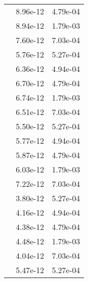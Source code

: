 \begin{table}
\begin{tabular}{c|cc|}
\multicolumn{1}{|c|}{} & \multicolumn{1}{|c|}{  8.96e-12} & \multicolumn{1}{|c|}{  4.79e-04} \\ 
\multicolumn{1}{|c|}{} & \multicolumn{1}{|c|}{  8.94e-12} & \multicolumn{1}{|c|}{  1.79e-03} \\ 
\multicolumn{1}{|c|}{} & \multicolumn{1}{|c|}{  7.60e-12} & \multicolumn{1}{|c|}{  7.03e-04} \\ 
\multicolumn{1}{|c|}{} & \multicolumn{1}{|c|}{  5.76e-12} & \multicolumn{1}{|c|}{  5.27e-04} \\ 
\multicolumn{1}{|c|}{} & \multicolumn{1}{|c|}{  6.36e-12} & \multicolumn{1}{|c|}{  4.94e-04} \\ 
\multicolumn{1}{|c|}{} & \multicolumn{1}{|c|}{  6.70e-12} & \multicolumn{1}{|c|}{  4.79e-04} \\ 
\multicolumn{1}{|c|}{} & \multicolumn{1}{|c|}{  6.74e-12} & \multicolumn{1}{|c|}{  1.79e-03} \\ 
\multicolumn{1}{|c|}{} & \multicolumn{1}{|c|}{  6.51e-12} & \multicolumn{1}{|c|}{  7.03e-04} \\ 
\multicolumn{1}{|c|}{} & \multicolumn{1}{|c|}{  5.50e-12} & \multicolumn{1}{|c|}{  5.27e-04} \\ 
\multicolumn{1}{|c|}{} & \multicolumn{1}{|c|}{  5.77e-12} & \multicolumn{1}{|c|}{  4.94e-04} \\ 
\multicolumn{1}{|c|}{} & \multicolumn{1}{|c|}{  5.87e-12} & \multicolumn{1}{|c|}{  4.79e-04} \\ 
\multicolumn{1}{|c|}{} & \multicolumn{1}{|c|}{  6.03e-12} & \multicolumn{1}{|c|}{  1.79e-03} \\ 
\multicolumn{1}{|c|}{} & \multicolumn{1}{|c|}{  7.22e-12} & \multicolumn{1}{|c|}{  7.03e-04} \\ 
\multicolumn{1}{|c|}{} & \multicolumn{1}{|c|}{  3.80e-12} & \multicolumn{1}{|c|}{  5.27e-04} \\ 
\multicolumn{1}{|c|}{} & \multicolumn{1}{|c|}{  4.16e-12} & \multicolumn{1}{|c|}{  4.94e-04} \\ 
\multicolumn{1}{|c|}{} & \multicolumn{1}{|c|}{  4.38e-12} & \multicolumn{1}{|c|}{  4.79e-04} \\ 
\multicolumn{1}{|c|}{} & \multicolumn{1}{|c|}{  4.48e-12} & \multicolumn{1}{|c|}{  1.79e-03} \\ 
\multicolumn{1}{|c|}{} & \multicolumn{1}{|c|}{  4.04e-12} & \multicolumn{1}{|c|}{  7.03e-04} \\ 
\multicolumn{1}{|c|}{} & \multicolumn{1}{|c|}{  5.47e-12} & \multicolumn{1}{|c|}{  5.27e-04} \\ 

\end{tabular}
\end{table}
